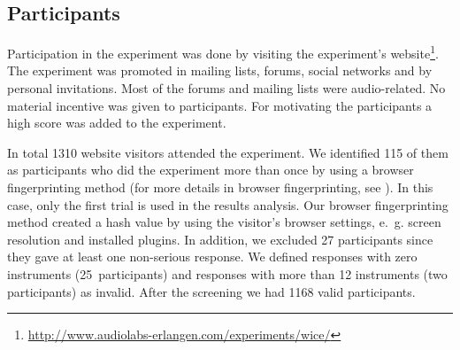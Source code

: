 \subsection{Participants}
Participation in the experiment was done by visiting the experiment's website\footnote{{\scriptsize\url{http://www.audiolabs-erlangen.com/experiments/wice/}}}. The experiment was promoted in mailing lists, forums, social networks and by personal invitations. Most of the forums and mailing lists were audio-related. No material incentive was given to participants. For motivating the participants a high score was added to the experiment.

In total 1310 website visitors attended the experiment. We identified 115 of them as participants who did the experiment more than once by using a browser fingerprinting method (for more details in browser fingerprinting, see \cite{Eckersley2010}). In this case, only the first trial is used in the results analysis. Our browser fingerprinting method created a hash value by using the visitor's browser settings, e.~g. screen resolution and installed plugins. In addition, we excluded 27 participants since they gave at least one non-serious response. We defined responses with zero instruments (25~participants) and responses with more than 12 instruments (two participants) as invalid. After the screening we had 1168 valid participants.

